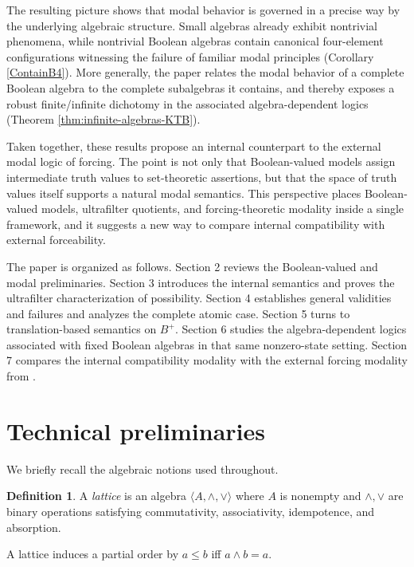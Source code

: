 \documentclass[11pt]{amsart}
\theoremstyle{definition}
\newtheorem{definition}{Definition}[section]
\theoremstyle{plain}
\begin{document}
The resulting picture shows that modal behavior is governed in a precise way by the underlying
algebraic structure. Small algebras already exhibit nontrivial phenomena, while nontrivial Boolean
algebras contain canonical four-element configurations witnessing the failure of familiar modal
principles (Corollary \ref{ContainB4}). More generally, the paper relates the modal behavior of a complete Boolean algebra to
the complete subalgebras it contains, and thereby exposes a robust finite/infinite dichotomy in the
associated algebra-dependent logics (Theorem \ref{thm:infinite-algebras-KTB}).

Taken together, these results propose an internal counterpart to the external modal logic of forcing.
The point is not only that Boolean-valued models assign intermediate truth values to set-theoretic
assertions, but that the space of truth values itself supports a natural modal semantics. This
perspective places Boolean-valued models, ultrafilter quotients, and forcing-theoretic modality
inside a single framework, and it suggests a new way to compare internal compatibility with external
forceability.

The paper is organized as follows. Section 2 reviews the Boolean-valued and modal preliminaries.
Section 3 introduces the internal semantics and proves the ultrafilter characterization of possibility.
Section 4 establishes general validities and failures and analyzes the complete atomic case. Section 5
turns to translation-based semantics on $B^+$. Section 6 studies the algebra-dependent logics
associated with fixed Boolean algebras in that same nonzero-state setting. Section 7 compares the
internal compatibility modality with the external forcing modality from \cite{HamkinsLowe}.

\section{Technical preliminaries}

We briefly recall the algebraic notions used throughout.

\begin{definition}
A \emph{lattice} is an algebra $\langle A,\wedge,\vee\rangle$ where $A$ is nonempty and
$\wedge,\vee$ are binary operations satisfying commutativity, associativity, idempotence, and
absorption.
\end{definition}

A lattice induces a partial order by $a\le b$ iff $a\wedge b=a$.
\end{document}
